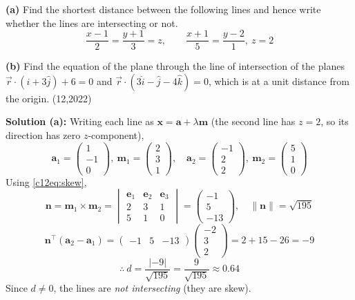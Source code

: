 \clearpage
\item \textbf{(a)} Find the shortest distance between the following lines and hence write whether the lines are intersecting or not.
\begin{equation*}
\frac{x-1}{2} = \frac{y+1}{3} = z, \qquad \frac{x+1}{5} = \frac{y-2}{1}, \ z = 2
\end{equation*}

\textbf{(b)} Find the equation of the plane through the line of intersection of the planes $\vec{r}\cdot(\hat{i} + 3\hat{j}) + 6 = 0$ and $\vec{r}\cdot(3\hat{i} - \hat{j} - 4\hat{k}) = 0$, which is at a unit distance from the origin. \hfill (12,2022)

\textbf{Solution (a):} Writing each line as $\mathbf{x} = \mathbf{a} + \lambda\mathbf{m}$ (the second line has $z = 2$, so its direction has zero $z$-component),
\begin{equation}
\mathbf{a}_1 = \begin{pmatrix} 1 \\ -1 \\ 0 \end{pmatrix}, \
\mathbf{m}_1 = \begin{pmatrix} 2 \\ 3 \\ 1 \end{pmatrix}, \quad
\mathbf{a}_2 = \begin{pmatrix} -1 \\ 2 \\ 2 \end{pmatrix}, \
\mathbf{m}_2 = \begin{pmatrix} 5 \\ 1 \\ 0 \end{pmatrix}
\end{equation}
Using \eqref{c12eq:skew},
\begin{equation}
\mathbf{n} = \mathbf{m}_1 \times \mathbf{m}_2 = \begin{vmatrix} \mathbf{e}_1 & \mathbf{e}_2 & \mathbf{e}_3 \\ 2 & 3 & 1 \\ 5 & 1 & 0 \end{vmatrix} = \begin{pmatrix} -1 \\ 5 \\ -13 \end{pmatrix}, \quad
\|\mathbf{n}\| = \sqrt{195}
\end{equation}
\begin{equation}
\mathbf{n}^{\top}(\mathbf{a}_2 - \mathbf{a}_1) = \begin{pmatrix} -1 & 5 & -13 \end{pmatrix}\begin{pmatrix} -2 \\ 3 \\ 2 \end{pmatrix} = 2 + 15 - 26 = -9
\end{equation}
\begin{equation}
\therefore\ d = \frac{|-9|}{\sqrt{195}} = \frac{9}{\sqrt{195}} \approx 0.64
\end{equation}
Since $d \neq 0$, the lines are \emph{not intersecting} (they are skew).

